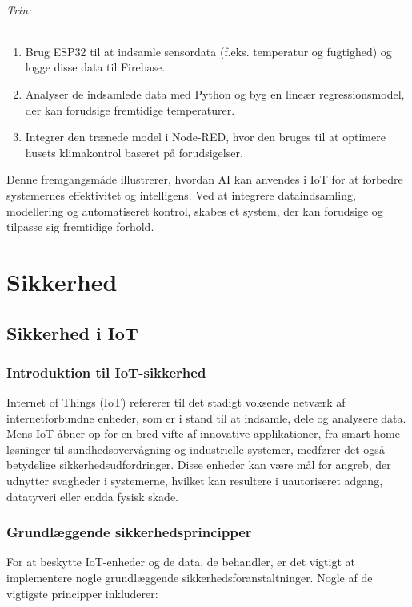 \paragraph{Trin:}
\begin{enumerate}
	\item Brug ESP32 til at indsamle sensordata (f.eks. temperatur og fugtighed) og logge disse data til Firebase.
	\item Analyser de indsamlede data med Python og byg en lineær regressionsmodel, der kan forudsige fremtidige temperaturer.
	\item Integrer den trænede model i Node-RED, hvor den bruges til at optimere husets klimakontrol baseret på forudsigelser.
\end{enumerate}
Denne fremgangsmåde illustrerer, hvordan AI kan anvendes i IoT for at forbedre systemernes effektivitet og intelligens. Ved at integrere dataindsamling, modellering og automatiseret kontrol, skabes et system, der kan forudsige og tilpasse sig fremtidige forhold.	

\part{Sikkerhed}
\chapter{Sikkerhed i IoT}
\section*{Introduktion til IoT-sikkerhed}
Internet of Things (IoT) refererer til det stadigt voksende netværk af internetforbundne enheder, som er i stand til at indsamle, dele og analysere data. Mens IoT åbner op for en bred vifte af innovative applikationer, fra smart home-løsninger til sundhedsovervågning og industrielle systemer, medfører det også betydelige sikkerhedsudfordringer. Disse enheder kan være mål for angreb, der udnytter svagheder i systemerne, hvilket kan resultere i uautoriseret adgang, datatyveri eller endda fysisk skade.

\section*{Grundlæggende sikkerhedsprincipper}
For at beskytte IoT-enheder og de data, de behandler, er det vigtigt at implementere nogle grundlæggende sikkerhedsforanstaltninger. Nogle af de vigtigste principper inkluderer:

